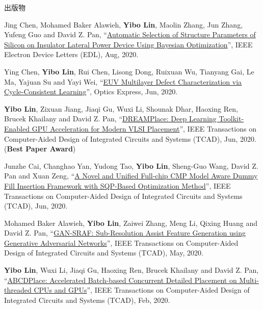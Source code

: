 \begin{rSection}{出版物}
\begin{description}[font=\normalfont, rightmargin=2em]
{}
            

\item[{[J23]}]{
        Jing Chen, Mohamed Baker Alawieh, \textbf{Yibo Lin}, Maolin Zhang, Jun Zhang, Yufeng Guo and David Z. Pan, 
    ``\href{https://doi.org/10.1109/LED.2020.3013571}{Automatic Selection of Structure Parameters of Silicon on Insulator Lateral Power Device Using Bayesian Optimization}'', 
    IEEE Electron Device Letters (EDL), Aug, 2020.
    
}
            

\item[{[J22]}]{
        Ying Chen, \textbf{Yibo Lin}, Rui Chen, Lisong Dong, Ruixuan Wu, Tianyang Gai, Le Ma, Yajuan Su and Yayi Wei, 
    ``\href{https://doi.org/10.1364/OE.394590}{EUV Multilayer Defect Characterization via Cycle-Consistent Learning}'', 
    Optics Express, Jun, 2020.
    
}
            

\item[{[J21]}]{
        \textbf{Yibo Lin}, Zixuan Jiang, Jiaqi Gu, Wuxi Li, Shounak Dhar, Haoxing Ren, Brucek Khailany and David Z. Pan, 
    ``\href{https://doi.org/10.1109/TCAD.2020.3003843}{DREAMPlace: Deep Learning Toolkit-Enabled GPU Acceleration for Modern VLSI Placement}'', 
    IEEE Transactions on Computer-Aided Design of Integrated Circuits and Systems (TCAD), Jun, 2020.
    (\textbf{Best Paper Award})
}
            

\item[{[J20]}]{
        Junzhe Cai, Changhao Yan, Yudong Tao, \textbf{Yibo Lin}, Sheng-Guo Wang, David Z. Pan and Xuan Zeng, 
    ``\href{https://doi.org/10.1109/TCAD.2020.3001380}{A Novel and Unified Full-chip CMP Model Aware Dummy Fill Insertion Framework with SQP-Based Optimization Method}'', 
    IEEE Transactions on Computer-Aided Design of Integrated Circuits and Systems (TCAD), Jun, 2020.
    
}
            

\item[{[J19]}]{
        Mohamed Baker Alawieh, \textbf{Yibo Lin}, Zaiwei Zhang, Meng Li, Qixing Huang and David Z. Pan, 
    ``\href{https://doi.org/10.1109/TCAD.2020.2995338}{GAN-SRAF: Sub-Resolution Assist Feature Generation using Generative Adversarial Networks}'', 
    IEEE Transactions on Computer-Aided Design of Integrated Circuits and Systems (TCAD), May, 2020.
    
}
            

\item[{[J18]}]{
        \textbf{Yibo Lin}, Wuxi Li, Jiaqi Gu, Haoxing Ren, Brucek Khailany and David Z. Pan, 
    ``\href{https://doi.org/10.1109/TCAD.2020.2971531}{ABCDPlace: Accelerated Batch-based Concurrent Detailed Placement on Multi-threaded CPUs and GPUs}'', 
    IEEE Transactions on Computer-Aided Design of Integrated Circuits and Systems (TCAD), Feb, 2020.
    
}
\end{description}
\end{rSection}
